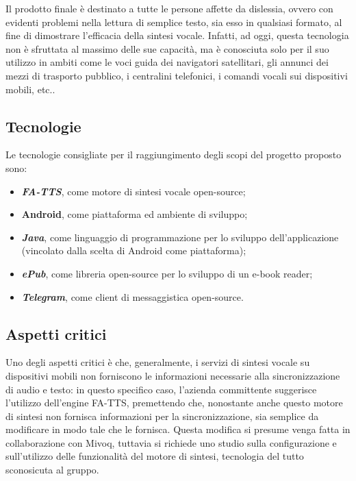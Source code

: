 Il prodotto finale è destinato a tutte le persone affette da dislessia, ovvero con evidenti problemi nella lettura di semplice testo, sia esso in qualsiasi formato, al fine di dimostrare l'efficacia della sintesi vocale. Infatti, ad oggi, questa tecnologia non è sfruttata al massimo delle sue capacità, ma è conosciuta solo per il suo utilizzo
in ambiti come le voci guida dei navigatori satellitari, gli annunci dei mezzi di trasporto pubblico, i centralini telefonici, i comandi vocali sui dispositivi mobili, etc..

\subsection{Tecnologie}

Le tecnologie consigliate per il raggiungimento degli scopi del progetto proposto sono:
\begin{itemize}
	\item \textbf{\textit{FA-TTS}},
	come motore di sintesi vocale open-source;
	\item \textbf{Android}, come piattaforma ed ambiente di sviluppo;
	\item \textbf{\textit{Java}}, come linguaggio di programmazione per lo sviluppo dell'applicazione
	(vincolato dalla scelta di Android come piattaforma);
	\item \textbf{\textit{ePub}}, come libreria open-source per lo sviluppo di un e-book
	reader;
	\item \textbf{\textit{Telegram}}, come client di messaggistica open-source.
\end{itemize}

\subsection{Aspetti critici}

Uno degli aspetti critici è che, generalmente, i servizi di sintesi vocale su dispositivi mobili non forniscono le informazioni necessarie
alla sincronizzazione di audio e testo: in questo specifico caso,
l'azienda committente suggerisce l'utilizzo dell'engine FA-TTS,
premettendo che, nonostante anche questo motore di sintesi non fornisca
informazioni per la sincronizzazione, sia semplice da modificare in
modo tale che le fornisca. Questa modifica si presume venga fatta in collaborazione con Mivoq,
tuttavia si richiede uno studio sulla configurazione e sull'utilizzo delle funzionalità del motore di sintesi, tecnologia del tutto sconosicuta al gruppo. 

